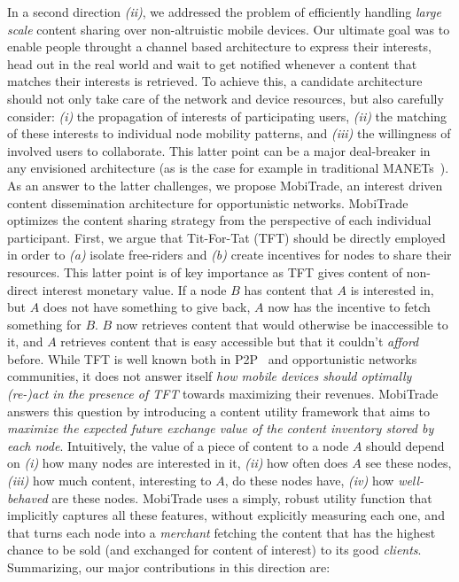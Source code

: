 In a second direction \emph{(ii)}, we addressed the problem of efficiently handling \emph{large scale} content sharing over non-altruistic mobile devices. Our ultimate goal was to enable people throught a channel based architecture to express their interests, head out in the real world and wait to get notified whenever a content that matches their interests is retrieved. To achieve this, a candidate architecture should not only take care of the network and device resources, but also carefully consider: \emph{(i)} the propagation of interests of participating users, \emph{(ii)} the matching of these interests to individual node mobility patterns, and \emph{(iii)} the willingness of involved users to collaborate. This latter point can be a major deal-breaker in any envisioned architecture (as is the case for example in traditional MANETs~\cite{NashEquilibria}). As an answer to the latter challenges, we propose MobiTrade, an interest driven content dissemination architecture for opportunistic networks. MobiTrade optimizes the content sharing strategy from the perspective of each individual participant. First, we argue that Tit-For-Tat (TFT) should be directly employed in order to \emph{(a)} isolate free-riders and \emph{(b)} create incentives for nodes to share their resources. This latter point is of key importance as TFT gives content of non-direct interest monetary value. If a node $B$ has content that $A$ is interested in, but $A$ does not have something to give back, $A$ now has the incentive to fetch something for $B$. $B$ now retrieves content that would otherwise be inaccessible to it, and $A$ retrieves content that is easy accessible but that it couldn't \emph{afford} before. While TFT is well known both in P2P~\cite{BitHoc} and opportunistic networks~\cite{BarterDTN} communities, it does not answer itself \emph{how mobile devices should optimally (re-)act in the presence of TFT} towards maximizing their revenues. MobiTrade answers this question by introducing a content utility framework that aims to \emph{maximize the expected future exchange value of the content inventory stored by each node}. Intuitively, the value of a piece of content to a node $A$ should depend on \emph{(i)} how many nodes are interested in it, \emph{(ii)} how often does $A$ see these nodes, \emph{(iii)} how much content, interesting to $A$, do these nodes have, \emph{(iv)} how \emph{well-behaved} are these nodes. MobiTrade uses a simply, robust utility function that implicitly captures all these features, without explicitly measuring each one, and that turns each node into a \emph{merchant} fetching the content that has the highest chance to be sold (and exchanged for content of interest) to its good \emph{clients}. Summarizing, our major contributions in this direction are:
